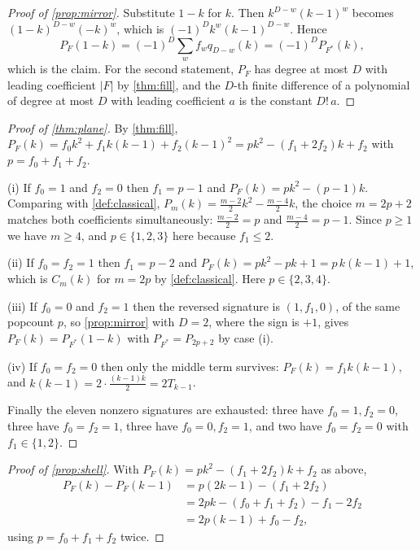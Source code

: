 \documentclass[11pt]{amsart}
\theoremstyle{definition}
\theoremstyle{remark}
\begin{document}
\begin{proof}[Proof of \cref{prop:mirror}]
Substitute $1-k$ for $k$. Then $k^{D-w}(k-1)^{w}$ becomes $(1-k)^{D-w}(-k)^{w}$, which is $(-1)^{D}k^{w}(k-1)^{D-w}$. Hence
\[
  P_{F}(1-k) = (-1)^{D}\sum_{w}f_{w}q_{D-w}(k) = (-1)^{D}P_{F^{\ast}}(k),
\]
which is the claim. For the second statement, $P_{F}$ has degree at most $D$ with leading coefficient $|F|$ by \cref{thm:fill}, and the $D$-th finite difference of a polynomial of degree at most $D$ with leading coefficient $a$ is the constant $D!\,a$.
\end{proof}

\begin{proof}[Proof of \cref{thm:plane}]
By \cref{thm:fill}, $P_{F}(k) = f_{0}k^{2}+f_{1}k(k-1)+f_{2}(k-1)^{2} = pk^{2}-(f_{1}+2f_{2})k+f_{2}$ with $p = f_{0}+f_{1}+f_{2}$.

(i) If $f_{0}=1$ and $f_{2}=0$ then $f_{1}=p-1$ and $P_{F}(k) = pk^{2}-(p-1)k$. Comparing with \cref{def:classical}, $P_{m}(k) = \frac{m-2}{2}k^{2}-\frac{m-4}{2}k$, the choice $m = 2p+2$ matches both coefficients simultaneously: $\frac{m-2}{2} = p$ and $\frac{m-4}{2} = p-1$. Since $p \ge 1$ we have $m \ge 4$, and $p \in \{1,2,3\}$ here because $f_{1} \le 2$.

(ii) If $f_{0}=f_{2}=1$ then $f_{1}=p-2$ and $P_{F}(k) = pk^{2}-pk+1 = p\,k(k-1)+1$, which is $C_{m}(k)$ for $m = 2p$ by \cref{def:classical}. Here $p \in \{2,3,4\}$.

(iii) If $f_{0}=0$ and $f_{2}=1$ then the reversed signature is $(1,f_{1},0)$, of the same popcount $p$, so \cref{prop:mirror} with $D=2$, where the sign is $+1$, gives $P_{F}(k) = P_{F^{\ast}}(1-k)$ with $P_{F^{\ast}} = P_{2p+2}$ by case (i).

(iv) If $f_{0}=f_{2}=0$ then only the middle term survives: $P_{F}(k) = f_{1}k(k-1)$, and $k(k-1) = 2\cdot\frac{(k-1)k}{2} = 2T_{k-1}$.

Finally the eleven nonzero signatures are exhausted: three have $f_{0}=1,f_{2}=0$, three have $f_{0}=f_{2}=1$, three have $f_{0}=0,f_{2}=1$, and two have $f_{0}=f_{2}=0$ with $f_{1} \in \{1,2\}$.
\end{proof}

\begin{proof}[Proof of \cref{prop:shell}]
With $P_{F}(k) = pk^{2}-(f_{1}+2f_{2})k+f_{2}$ as above,
\begin{align*}
  P_{F}(k)-P_{F}(k-1) &= p(2k-1)-(f_{1}+2f_{2})\\
  &= 2pk - (f_{0}+f_{1}+f_{2}) - f_{1}-2f_{2}\\
  &= 2p(k-1)+f_{0}-f_{2},
\end{align*}
using $p = f_{0}+f_{1}+f_{2}$ twice.
\end{proof}
\end{document}
